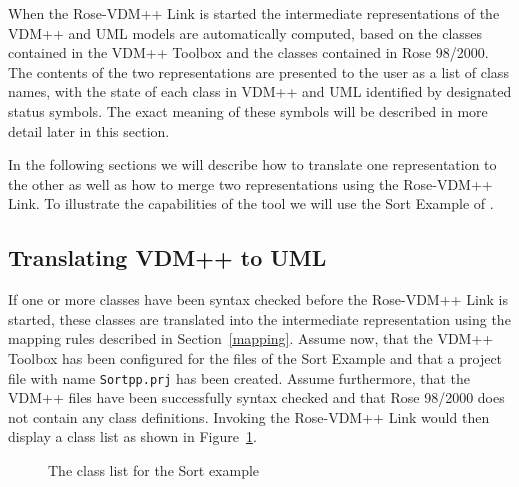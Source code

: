 \documentclass[\pformat,12pt]{article}
\newcommand{\vdmpp}{VDM++}
\newcommand{\link}{Rose-\vdmpp{} Link}
\newcommand{\rose}{Rose 98/2000}
\begin{document}



When the \link{} is started the intermediate representations of the
\vdmpp{} and UML models are automatically computed, based on the
classes contained in the \vdmpp{} Toolbox and the classes contained in
\rose{}. The contents of the two representations are presented to the
user as a list of class names, with the state of each class in
\vdmpp{} and UML identified by designated status symbols. The exact
meaning of these symbols will be described in more detail later in
this section.
   
In the following sections we will describe how to translate one representation to the other   
as well as how to merge two representations using the \link{}. To illustrate the   
capabilities of the tool we will use the Sort Example of \cite{UserManPP-CSK}.  

\subsection{Translating VDM++ to UML}
\label{trans1}

If one or more classes have been syntax checked before the \link{} is
started, these classes are translated into the intermediate
representation using the mapping rules described in
Section~\ref{mapping}.  Assume now, that the \vdmpp{} Toolbox has been
configured for the files of the Sort Example and that a project file
with name {\tt Sortpp.prj} has been created. Assume furthermore, that
the \vdmpp{} files have been successfully syntax checked and that \rose{}
does not contain any class definitions. Invoking the \link{} would
then display a class list as shown in Figure~\ref{fig:VDMtoUML}.

\begin{figure}[htb]
\begin{center}
\mbox{}
\caption{The class list for the Sort example\label{fig:VDMtoUML}}
\end{center}
\end{figure}
\end{document}
